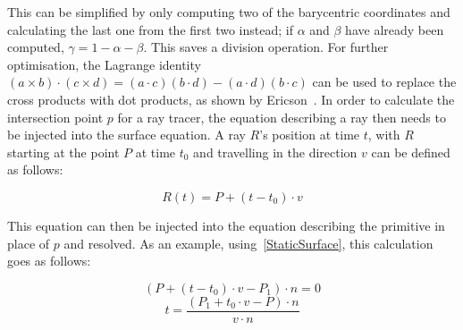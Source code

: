This can be simplified by only computing two of the barycentric coordinates
and calculating the last one from the first two instead; if \(\alpha\) and \(\beta\) have already been computed,
\(\gamma = 1 - \alpha - \beta\). This saves a division operation.
For further optimisation, the Lagrange identity \((a \times b) \cdot (c \times d) = (a \cdot c)(b \cdot d) - (a \cdot d)(b \cdot c)\)
can be used to replace the cross products with dot products, as shown by Ericson~\cite{Er04}.
\newline
In order to calculate the intersection point \(p\) for a ray tracer, the equation describing a ray then needs to be injected into the surface equation.
A ray \(R\)'s position at time \(t\), with \(R\) starting at the point \(P\) at time \(t_0\)
and travelling in the direction \(v\) can be defined as follows:

\begin{equation}\label{RayEq}
    R(t) = P + (t - t_0) \cdot v
\end{equation}

This equation can then be injected into the equation describing the primitive in place of \(p\) and resolved.
As an example, using~\eqref{StaticSurface}, this calculation goes as follows:

\begin{equation*}
    (P + (t - t_0) \cdot v - P_1) \cdot n = 0
\end{equation*}
\begin{equation}\label{StaticSurfaceIntersect}
    t = \frac{(P_1 + t_0 \cdot v - P) \cdot n}{v \cdot n}
\end{equation}

